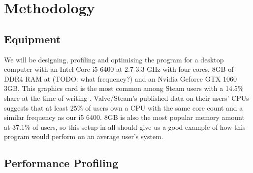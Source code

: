 \documentclass[11pt, a4paper, twocolumn]{article}
\begin{document}

\section{Methodology}


\subsection{Equipment}

We will be designing, profiling and optimising the program for a desktop computer with an Intel Core i5 6400 at 2.7-3.3 GHz with four cores, 8GB of DDR4 RAM at (TODO: what frequency?) and an Nvidia Geforce GTX 1060 3GB. This  graphics card is the most common among Steam users with a 14.5\% share at the time of writing \citep{SteamSurvey}. Valve/Steam's published data on their users' CPUs suggests that at least 25\% of users own a CPU with the same core count and a similar frequency as our i5 6400. 8GB is also the most popular memory amount at 37.1\% of users, so this setup in all should give us a good example of how this program would perform on an average user's system.



\subsection{Performance Profiling}

\end{document}
